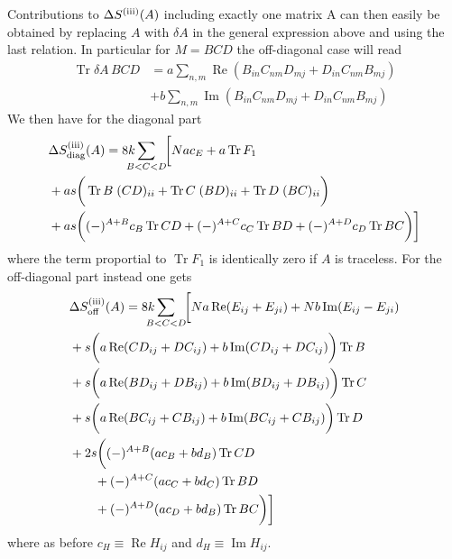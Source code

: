 \documentclass[10pt,a4paper]{article}
\newcommand{\RN}[1]{%
    \textup{\uppercase\expandafter{\romannumeral#1}}%
}
\DeclareMathOperator{\Tr}{Tr}
\newcommand{\deltaA}{\delta \! A}
\begin{document}
Contributions to $\Delta S^{(\RN 3)}(A)$ including exactly one matrix A
can then easily be obtained by replacing $A$ with $\deltaA$ in the
general expression above and using the last relation.
In particular for $M=BCD$ the off-diagonal case will read
\begin{align}
  \Tr \deltaA \,BCD &=
    a \sum_{n,m} \operatorname{Re}
    \left( B_{in} C_{nm} D_{mj} + D_{in} C_{nm} B_{mj} \right) \\
    &+ b \sum_{n,m} \operatorname{Im}
    \left( B_{in} C_{nm} D_{mj} + D_{in} C_{nm} B_{mj} \right)
\end{align}
We then have for the diagonal part
\begin{align}
  &\Delta S^{(\RN{3})}_{\text{diag}} (A) =
    8k \sum_{\mathclap{B < C < D}}
    \;\;
    \bigg[
      N a c_E + a \Tr F_1 \\
      &+ a s
      \bigg(
      \Tr B \; (C D)_{ii} + \Tr C \; (B D)_{ii} + \Tr D \; (B C)_{ii}
      \bigg) \\
      &+ a s \bigg(
        (-)^{A+B} c_B \Tr C D +
        (-)^{A+C} c_C \Tr B D +
        (-)^{A+D} c_D \Tr B C
      \bigg)
    \bigg]
\end{align}
where the term proportial to $\Tr F_1$ is identically zero if $A$ is traceless.
For the off-diagonal part instead one gets
\begin{align}
  &\Delta S^{(\RN{3})}_{\text{off}} (A) =
    8k \sum_{\mathclap{B < C < D}}
    \;\;
    \bigg[
      N a \operatorname{Re} (E_{ij} + E_{ji}) + N b \operatorname{Im} (E_{ij} - E_{ji}) \\
      &+ s
      \bigg(
        a \operatorname{Re} (C D_{ij} + D C_{ij}) + b \operatorname{Im} (C D_{ij} + D C_{ij})
      \bigg)  \Tr B\\
      &+ s
      \bigg(
        a \operatorname{Re} (B D_{ij} + D B_{ij}) + b \operatorname{Im} (B D_{ij} + D B_{ij})
      \bigg) \Tr C\\
      &+ s
      \bigg(
        a \operatorname{Re} (B C_{ij} + C B_{ij}) + b \operatorname{Im} (B C_{ij} + C B_{ij})
      \bigg) \Tr D \\
      &+ 2 s
      \bigg(
        (-)^{A+B} (a c_B + b d_B) \Tr C D \\
        &\quad \quad + (-)^{A+C} (a c_C + b d_C) \Tr B D \\
        &\quad \quad + (-)^{A+D} (a c_D + b d_B) \Tr B C
      \bigg)
    \bigg]
\end{align}
where as before $c_H \equiv \operatorname{Re} H_{ij}$ and $d_H \equiv \operatorname{Im} H_{ij}$.
\end{document}
